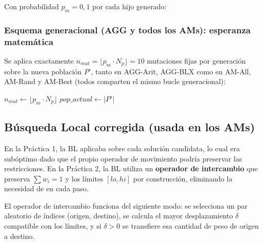 \documentclass[12pt,a4paper]{article}
\begin{document}
Con probabilidad $p_m=0{,}1$ por cada hijo generado:

\begin{algorithm}[H]
\caption{Aplicar mutación en AGE($h$, problema)}
\end{algorithm}

\subsubsection*{Esquema generacional (AGG y todos los AMs): esperanza matemática}

Se aplica exactamente $n_{mut} = \lfloor p_m \cdot N_p \rfloor = 10$ mutaciones fijas
por generación sobre la nueva población $P'$, tanto en AGG-Arit, AGG-BLX como en
AM-All, AM-Rand y AM-Best (todos comparten el mismo bucle generacional):

\begin{algorithm}[H]
\caption{Aplicar mutaciones en AGG/AMs (esperanza matemática)}
$n_{mut} \leftarrow \lfloor p_m \cdot N_p \rfloor$\;
$pop\_actual \leftarrow |P'|$\;
\end{algorithm}

\subsection{Búsqueda Local corregida (usada en los AMs)}

En la Práctica 1, la BL aplicaba \fix{} sobre cada solución candidata, lo cual era
subóptimo dado que el propio operador de movimiento podría preservar las restricciones.
En la Práctica 2, la BL utiliza un \textbf{operador de intercambio} que preserva
$\sum w_i = 1$ y los límites $[lo,hi]$ por construcción, eliminando la necesidad de
\fix{} en cada paso.

El operador de intercambio funciona del siguiente modo: se selecciona un par aleatorio
de índices (origen, destino), se calcula el mayor desplazamiento $\delta$ compatible
con los límites, y si $\delta > 0$ se transfiere esa cantidad de peso de origen a
destino.
\end{document}
